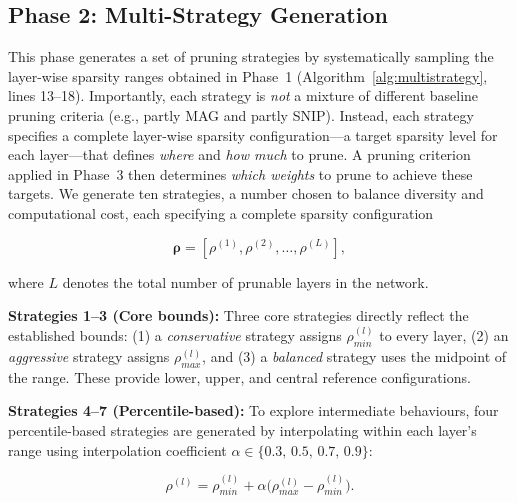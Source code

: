 \documentclass[11pt, conference]{IEEEtran}
\begin{document}


\subsection{Phase 2: Multi-Strategy Generation}

This phase generates a set of pruning strategies by systematically sampling the layer-wise sparsity ranges obtained in Phase~1 (Algorithm~\ref{alg:multistrategy}, lines 13--18). Importantly, each strategy is \emph{not} a mixture of different baseline pruning criteria (e.g., partly MAG and partly SNIP). Instead, each strategy specifies a complete layer-wise sparsity configuration—a target sparsity level for each layer—that defines \emph{where} and \emph{how much} to prune. A pruning criterion applied in Phase~3 then determines \emph{which weights} to prune to achieve these targets. We generate ten strategies, a number chosen to balance diversity and computational cost, each specifying a complete sparsity configuration

\begin{equation}
\boldsymbol{\rho} = [\rho^{(1)}, \rho^{(2)}, \ldots, \rho^{(L)}],
\end{equation}

where $L$ denotes the total number of prunable layers in the network.

\textbf{Strategies 1--3 (Core bounds):} Three core strategies directly reflect the established bounds: (1) a \emph{conservative} strategy assigns $\rho_{min}^{(l)}$ to every layer, (2) an \emph{aggressive} strategy assigns $\rho_{max}^{(l)}$, and (3) a \emph{balanced} strategy uses the midpoint of the range. These provide lower, upper, and central reference configurations.

\textbf{Strategies 4--7 (Percentile-based):} To explore intermediate behaviours, four percentile-based strategies are generated by interpolating within each layer's range using interpolation coefficient $\alpha \in \{0.3,\,0.5,\,0.7,\,0.9\}$:

\begin{equation}
\rho^{(l)} = \rho_{min}^{(l)} + \alpha\big(\rho_{max}^{(l)} - \rho_{min}^{(l)}\big).
\end{equation}
\end{document}
